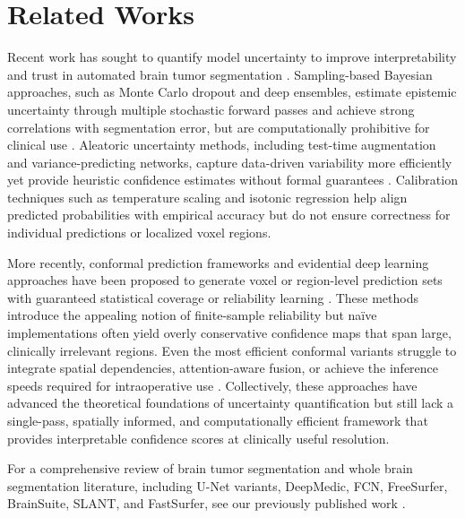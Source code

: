 \documentclass[11pt,letterpaper]{article}
\begin{document}
\section{Related Works}
Recent work has sought to quantify model uncertainty to improve interpretability and trust in automated brain tumor segmentation \cite{mehta2022qubrats,jungo2020analyzing}. Sampling-based Bayesian approaches, such as Monte Carlo dropout and deep ensembles, estimate epistemic uncertainty through multiple stochastic forward passes and achieve strong correlations with segmentation error, but are computationally prohibitive for clinical use \cite{wang2019aleatoric}. Aleatoric uncertainty methods, including test-time augmentation and variance-predicting networks, capture data-driven variability more efficiently yet provide heuristic confidence estimates without formal guarantees \cite{wang2019aleatoric}. Calibration techniques such as temperature scaling and isotonic regression help align predicted probabilities with empirical accuracy but do not ensure correctness for individual predictions or localized voxel regions.

More recently, conformal prediction frameworks and evidential deep learning approaches have been proposed to generate voxel or region-level prediction sets with guaranteed statistical coverage or reliability learning \cite{li2023region,huang2024deep}. These methods introduce the appealing notion of finite-sample reliability but naïve implementations often yield overly conservative confidence maps that span large, clinically irrelevant regions. Even the most efficient conformal variants struggle to integrate spatial dependencies, attention-aware fusion, or achieve the inference speeds required for intraoperative use \cite{zhou2023uncertainty,yang2024spu}. Collectively, these approaches have advanced the theoretical foundations of uncertainty quantification but still lack a single-pass, spatially informed, and computationally efficient framework that provides interpretable confidence scores at clinically useful resolution.

For a comprehensive review of brain tumor segmentation and whole brain segmentation literature, including U-Net variants, DeepMedic, FCN, FreeSurfer, BrainSuite, SLANT, and FastSurfer, see our previously published work \cite{zhou2025unified}.
\end{document}

